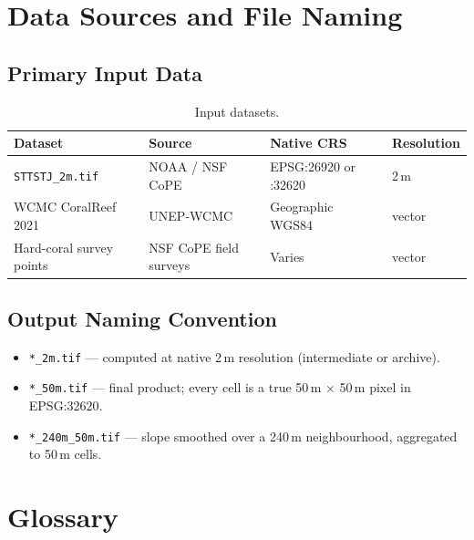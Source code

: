 \documentclass[11pt, a4paper]{article}
\begin{document}
\section{Data Sources and File Naming}

\subsection{Primary Input Data}

\begin{table}[h]
\centering
\caption{Input datasets.}
\begin{tabularx}{\linewidth}{L{4cm}L{3.5cm}L{3cm}L{2cm}}
\toprule
\textbf{Dataset} & \textbf{Source} & \textbf{Native CRS} & \textbf{Resolution} \\
\midrule
\texttt{STTSTJ\_2m.tif} & NOAA / NSF CoPE & EPSG:26920 or :32620 & 2\,m \\
WCMC CoralReef 2021 & UNEP-WCMC & Geographic WGS84 & vector \\
Hard-coral survey points & NSF CoPE field surveys & Varies & vector \\
\bottomrule
\end{tabularx}
\end{table}

\subsection{Output Naming Convention}

\begin{itemize}[noitemsep]
  \item \texttt{*\_2m.tif} — computed at native 2\,m resolution (intermediate or archive).
  \item \texttt{*\_50m.tif} — final product; every cell is a true
        50\,m $\times$ 50\,m pixel in EPSG:32620.
  \item \texttt{*\_240m\_50m.tif} — slope smoothed over a 240\,m neighbourhood,
        aggregated to 50\,m cells.
\end{itemize}

\section{Glossary}
\end{document}
